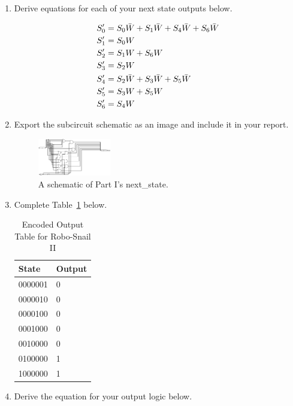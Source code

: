 \documentclass{article}
\begin{document}
\begin{enumerate}
\item Derive equations for each of your next state outputs below.

\begin{align*}
    S'_0 &= S_0\Bar{W} + S_1\Bar{W} + S_4\Bar{W} + S_6\Bar{W}\\
    S'_1 &= S_0W\\
    S'_2 &= S_1W + S_6W\\
    S'_3 &= S_2W\\
    S'_4 &= S_2\Bar{W} + S_3\Bar{W} + S_5\Bar{W}\\
    S'_5 &= S_3W + S_5W\\
    S'_6 &= S_4W\\
\end{align*}

\item Export the subcircuit schematic as an image and include it in your report.

\begin{figure}[ht!]
    \centering
    \includegraphics[width=0.3\textwidth]{lab6_part1_next_state.png}
    \caption{A schematic of Part I's next\_state.}
    \label{f:part1_next_state}
\end{figure}

\item Complete Table~\ref{t:part1_output_table} below.

\begin{table}[ht!]
\caption{Encoded Output Table for Robo-Snail II}
\label{t:part1_output_table}
\centering
\begin{tabular}{|l|l|}
\hline
State   & Output \\ \hline
0000001 & 0\\ \hline
0000010 & 0\\ \hline
0000100 & 0\\ \hline
0001000 & 0\\ \hline
0010000 & 0\\ \hline
0100000 & 1\\ \hline
1000000 & 1\\ \hline
\end{tabular}
\end{table}

\item Derive the equation for your output logic below.


\end{enumerate}
\end{document}
